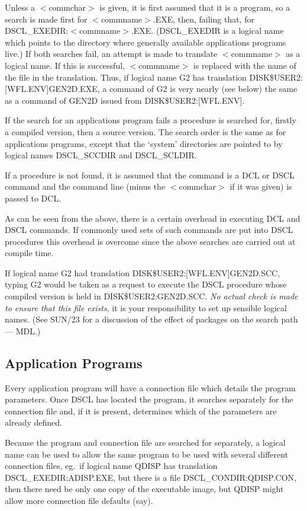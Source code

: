 Unless a $<$commchar$>$ is given, it is first assumed that it is a program, so a
search is made first for $<$commname$>$.EXE, then, failing that, for
DSCL\_EXEDIR:$<$commname$>$.EXE.
(DSCL\_EXEDIR is a logical name which points to the directory where generally
available applications programs live.)
If both searches fail, an attempt is made to translate $<$commname$>$ as a logical
name.
If this is successful, $<$commname$>$ is replaced with the name of the file in the
translation.
Thus, if logical name G2 has translation DISK\$USER2:[WFL.ENV]GEN2D.EXE, a
command of G2 is very nearly (see below) the same as a command of GEN2D issued
from DISK\$USER2:[WFL.ENV].

If the search for an applications program fails a procedure is searched for,
firstly a compiled version, then a source version.
The search order is the same as for applications programs, except that the
`system' directories are pointed to by logical names DSCL\_SCCDIR and
DSCL\_SCLDIR.

If a procedure is not found, it is assumed that the command is a DCL or DSCL
command and the command line (minus the $<$commchar$>$ if it was given) is passed to
DCL.

As can be seen from the above, there is a certain overhead in executing DCL and
DSCL commands.
If commonly used sets of such commands are put into DSCL procedures this
overhead is overcome since the above searches are carried out at compile time.

If logical name G2 had translation DISK\$USER2:[WFL.ENV]GEN2D.SCC, typing G2
would be taken as a request to execute the DSCL procedure whose compiled version
is held in DISK\$USER2:\-GEN2D.\-SCC.
{\em No actual check is made to ensure that this file exists}, it is your
responsibility to set up sensible logical names.
(See SUN/23 for a discussion of the effect of packages on the search path ---
MDL.)
\subsection {Application Programs}
Every application program will have a connection file which details the
program parameters.
Once DSCL has located the program, it searches separately for the connection
file and, if it is present, determines which of the parameters are already
defined.

Because the program and connection file are searched for separately, a logical
name can be used to allow the same program to be used with several different
connection files, eg.\ if logical name QDISP has translation
DSCL\_EXEDIR:ADISP.EXE, but there is a file DSCL\_CONDIR:QDISP.CON, then there
need be only one copy of the executable image, but QDISP might allow more
connection file defaults (say).
